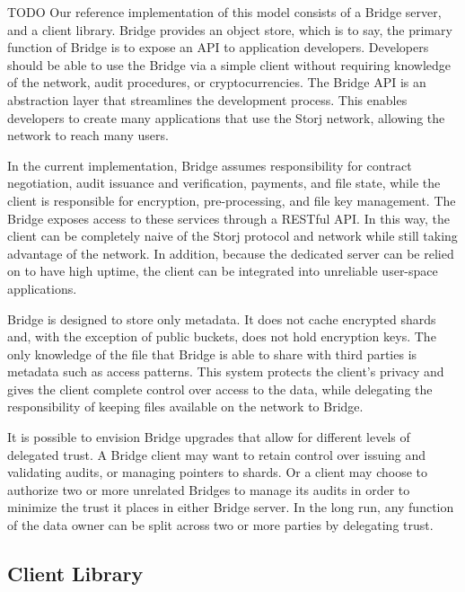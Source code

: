 \documentclass[a4paper,10pt]{article}
\newcommand{\todo}[1]{{\color{red} TODO #1}}
\begin{document}
\todo{
Our reference implementation of this model consists of a Bridge server, and a
client library. Bridge provides an object store, which is to say, the primary
function of Bridge is to expose an API to application developers. Developers
should be able to use the Bridge via a simple client without requiring knowledge
of the network, audit procedures, or cryptocurrencies. The Bridge API is an
abstraction layer that streamlines the development process. This enables
developers to create many applications that use the Storj network, allowing the
network to reach many users.

In the current implementation, Bridge assumes responsibility for contract
negotiation, audit issuance and verification, payments, and file state, while
the client is responsible for encryption, pre-processing, and file key
management. The Bridge exposes access to these services through a RESTful API.
In this way, the client can be completely naive of the Storj protocol and
network while still taking advantage of the network. In addition, because the
dedicated server can be relied on to have high uptime, the client can be
integrated into unreliable user-space applications.

Bridge is designed to store only metadata. It does not cache encrypted shards
and, with the exception of public buckets, does not hold encryption keys. The
only knowledge of the file that Bridge is able to share with third parties is
metadata such as access patterns. This system protects the client's privacy and
gives the client complete control over access to the data, while delegating the
responsibility of keeping files available on the network to Bridge.

It is possible to envision Bridge upgrades that allow for different levels of
delegated trust. A Bridge client may want to retain control over issuing and
validating audits, or managing pointers to shards. Or a client may choose to
authorize two or more unrelated Bridges to manage its audits in order to
minimize the trust it places in either Bridge server. In the long run, any
function of the data owner can be split across two or more parties by delegating
trust.
}

\subsection{Client Library}
\end{document}
